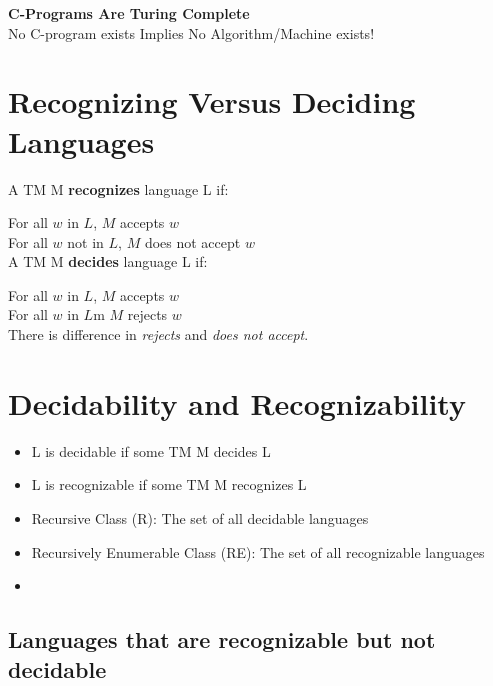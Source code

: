 \textbf{C-Programs Are Turing Complete}\\

No C-program exists Implies No Algorithm/Machine exists!\\

\section{Recognizing Versus Deciding Languages}

A TM M \textbf{recognizes} language L if:

For all $w$ in $L$, $M$ accepts $w$\\
For all $w$ not in $L$, $M$ does not accept $w$\\

A TM M \textbf{decides} language L if:

For all $w$ in $L$, $M$ accepts $w$\\
For all $w$ in $L$m $M$ rejects $w$\\

There is difference in \textit{rejects} and \textit{does not accept}. 

\section{Decidability and Recognizability}

\begin{itemize}
    \item L is decidable if some TM M decides L
    \item L is recognizable if some TM M recognizes L
    \item Recursive Class (R): The set of all decidable languages
    \item Recursively Enumerable Class (RE): The set of all recognizable 
        languages
    \item 
\end{itemize}

\subsection{Languages that are recognizable but not decidable}


